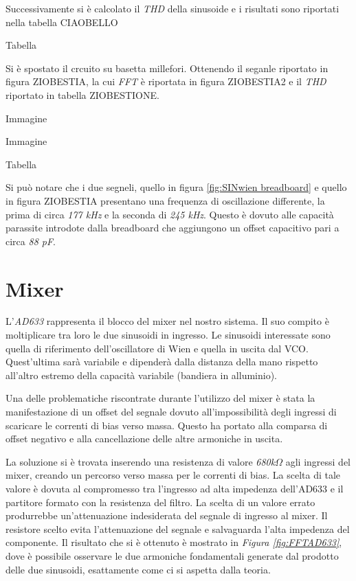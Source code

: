 \documentclass[titlepage]{report}
\begin{document}
	Successivamente si è calcolato il \textit{THD} della sinusoide e i risultati sono riportati nella tabella CIAOBELLO

	Tabella

	Si è spostato il crcuito su basetta millefori. Ottenendo il seganle riportato in figura ZIOBESTIA, la cui \textit{FFT} è riportata in figura ZIOBESTIA2 e il \textit{THD} riportato in tabella ZIOBESTIONE.

	Immagine

	Immagine

	Tabella

	Si può notare che i due segneli, quello in figura \ref{fig:SINwien breadboard} e quello in figura ZIOBESTIA presentano una frequenza di oscillazione differente, la prima di circa \textit{177 kHz} e la seconda di \textit{245 kHz}. Questo è dovuto alle capacità parassite introdote dalla breadboard che aggiungono un offset capacitivo pari a circa \textit{88 pF}.




\section{Mixer}
\label{sec:Mixer}

	L'\textit{AD633} rappresenta il blocco del mixer nel nostro sistema. Il suo compito è moltiplicare tra loro le due sinusoidi in ingresso. Le sinusoidi interessate sono quella di riferimento dell'oscillatore di Wien e quella in uscita dal VCO. Quest'ultima sarà variabile e dipenderà dalla distanza della mano rispetto all'altro estremo della capacità variabile (bandiera in alluminio).


	Una delle problematiche riscontrate durante l'utilizzo del mixer è stata la manifestazione di un offset del segnale dovuto all'impossibilità degli ingressi di scaricare le correnti di bias verso massa. Questo ha portato alla comparsa di offset negativo e alla cancellazione delle altre armoniche in uscita.

	La soluzione si è trovata inserendo una resistenza di valore \textit{680k$\Omega$} agli ingressi del mixer, creando un percorso verso massa per le correnti di bias. La scelta di tale valore è dovuta al compromesso tra l'ingresso ad alta impedenza dell'AD633 e il partitore formato con la resistenza del filtro. La scelta di un valore errato produrrebbe un'attenuazione indesiderata del segnale di ingresso al mixer. Il resistore scelto evita l'attenuazione del segnale e salvaguarda l'alta impedenza del componente. Il risultato che si è ottenuto è mostrato in \textit{Figura \ref{fig:FFTAD633}}, dove è possibile osservare le due armoniche fondamentali generate dal prodotto delle due sinusoidi, esattamente come ci si aspetta dalla teoria.
\end{document}
